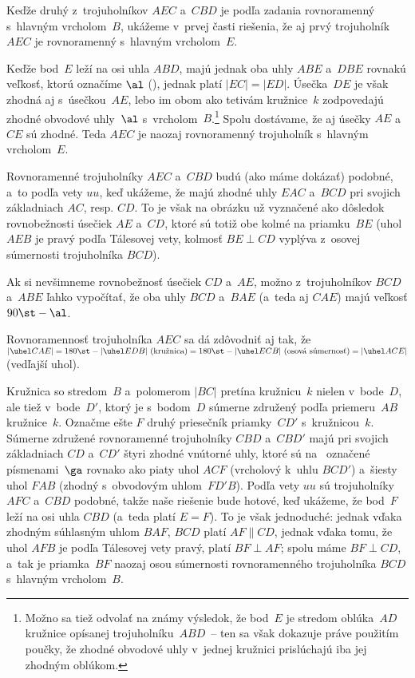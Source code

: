 {%
Keďže druhý z~trojuholníkov $AEC$ a~$CBD$ je podľa zadania rovnoramenný
s~hlavným vrcholom~$B$, ukážeme v~prvej časti riešenia,
že aj prvý trojuholník $AEC$ je rovnoramenný s~hlavným vrcholom~$E$.

Keďže bod~$E$ leží na osi uhla $ABD$, majú jednak oba uhly $ABE$ a~$DBE$
rovnakú veľkosť, ktorú označíme $\al$ (\obr), jednak platí $|EC|=|ED|$.
Úsečka~$DE$ je však zhodná aj s~úsečkou~$AE$, lebo
im obom ako tetivám kružnice~$k$ zodpovedajú
zhodné obvodové uhly~$\al$ s~vrcholom~$B$.\footnote{Možno sa tiež
odvolať na známy výsledok, že bod~$E$ je stredom oblúka~$AD$
kružnice opísanej trojuholníku~$ABD$~-- ten sa však dokazuje práve použitím
poučky, že zhodné obvodové uhly v~jednej kružnici prislúchajú iba
jej zhodným oblúkom.}
Spolu dostávame, že aj úsečky $AE$ a~$CE$ sú zhodné.
Teda $AEC$ je naozaj rovnoramenný trojuholník s~hlavným vrcholom~$E$.
%

Rovnoramenné trojuholníky $AEC$ a~$CBD$ budú (ako máme dokázať)
podobné, a~to podľa vety $uu$, keď ukážeme, že majú zhodné uhly
$EAC$ a~$BCD$ pri svojich základniach $AC$, resp. $CD$.
To je však na obrázku
už vyznačené ako dôsledok rovnobežnosti úsečiek $AE$ a~$CD$,
ktoré sú totiž obe kolmé na priamku~$BE$ (uhol $AEB$ je pravý
podľa Tálesovej vety, kolmosť $BE\perp CD$ vyplýva z~osovej
súmernosti trojuholníka $BCD$).

Ak si nevšimneme
rovnobežnosť úsečiek $CD$ a~$AE$, možno z~trojuholníkov $BCD$ a~$ABE$
ľahko vypočítať, že oba uhly $BCD$ a~$BAE$ (a~teda aj $CAE$)
majú veľkosť $90\st-\al$.

\poznamka
Rovnoramennosť trojuholníka $AEC$ sa dá zdôvodniť aj tak, že $|\uhel CAE| = 180\st -|\uhel EDB|
\hbox{ (kružnica)} = 180\st -|\uhel ECB| \hbox{ (osová súmernosť)} =|\uhel ACE|$ (vedľajší uhol).

\ineres
Kružnica so stredom~$B$ a~polomerom $|BC|$ pretína kružnicu~$k$
nielen v~bode~$D$, ale tiež v~bode~$D'$, ktorý je s~bodom~$D$
súmerne združený podľa priemeru~$AB$ kružnice~$k$. Označme ešte
$F$ druhý priesečník priamky~$CD'$ s~kružnicou~$k$.
Súmerne združené rovnoramenné trojuholníky $CBD$ a~$CBD'$ majú
pri svojich základniach $CD$ a~$CD'$ štyri zhodné vnútorné uhly,
ktoré sú na \obr\ označené písmenami~$\ga$ rovnako ako piaty uhol
$ACF$ (vrcholový k~uhlu $BCD'$) a~šiesty uhol $FAB$ (zhodný s~obvodovým
uhlom~$FD'B$).
%
Podľa vety $uu$ sú trojuholníky $AFC$ a~$CBD$ podobné,
takže naše riešenie bude hotové, keď ukážeme, že bod~$F$ leží na osi uhla
$CBD$ (a~teda platí $E=F$). To je však jednoduché: jednak vďaka zhodným
súhlasným uhlom $BAF$, $BCD$ platí $AF\parallel CD$, jednak vďaka tomu,
že uhol $AFB$ je podľa Tálesovej vety pravý, platí $BF\perp AF$;
spolu máme $BF\perp CD$, a~tak je priamka~$BF$ naozaj osou
súmernosti rovnoramenného trojuholníka $BCD$ s~hlavným vrcholom~$B$.

}
